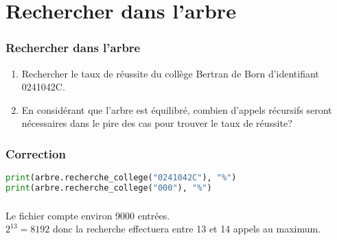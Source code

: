 \documentclass[svgnames,11pt]{beamer}
\begin{document}
\section{Rechercher dans l'arbre}
\begin{frame}
    \frametitle{Rechercher dans l'arbre}

    \begin{activite}
    \begin{enumerate} 
        \item Rechercher le taux de réussite du collège Bertran de Born d'identifiant 0241042C.
        \item En considérant que l'arbre est équilibré, combien d'appels récursifs seront nécessaires dans le pire des cas pour trouver le taux de réussite?
    \end{enumerate}
    \end{activite}

\end{frame}
\begin{frame}[fragile]
    \frametitle{Correction}

\begin{center}
\begin{lstlisting}[language=Python , basicstyle=\ttfamily\small, xleftmargin=2em, xrightmargin=2em]
print(arbre.recherche_college("0241042C"), "%")
print(arbre.recherche_college("000"), "%")
\end{lstlisting}
\end{center} 

\end{frame}
\begin{frame}
    \frametitle{}

    Le fichier compte environ 9000 entrées. \\$2^{13} = 8192$ donc la recherche effectuera entre 13 et 14 appels au maximum.

\end{frame}
\end{document}
